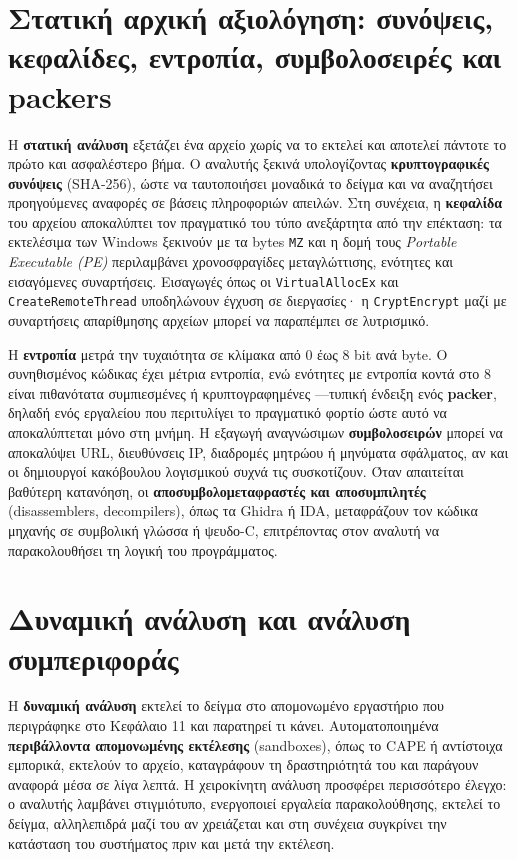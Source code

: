 \documentclass[11pt,openany]{book}
\begin{document}
\section{Στατική αρχική αξιολόγηση: συνόψεις, κεφαλίδες, εντροπία, συμβολοσειρές και packers}\label{sec:12.1}
Η \textbf{στατική ανάλυση} εξετάζει ένα αρχείο χωρίς να το εκτελεί και αποτελεί πάντοτε το πρώτο και ασφαλέστερο βήμα. Ο αναλυτής ξεκινά υπολογίζοντας \textbf{κρυπτογραφικές συνόψεις} (SHA-256), ώστε να ταυτοποιήσει μοναδικά το δείγμα και να αναζητήσει προηγούμενες αναφορές σε βάσεις πληροφοριών απειλών. Στη συνέχεια, η \textbf{κεφαλίδα} του αρχείου αποκαλύπτει τον πραγματικό του τύπο ανεξάρτητα από την επέκταση: τα εκτελέσιμα των Windows ξεκινούν με τα bytes \texttt{MZ} και η δομή τους \emph{Portable Executable (PE)} περιλαμβάνει χρονοσφραγίδες μεταγλώττισης, ενότητες και εισαγόμενες συναρτήσεις. Εισαγωγές όπως οι \texttt{VirtualAllocEx} και \texttt{CreateRemoteThread} υποδηλώνουν έγχυση σε διεργασίες· η \texttt{CryptEncrypt} μαζί με συναρτήσεις απαρίθμησης αρχείων μπορεί να παραπέμπει σε λυτρισμικό.

Η \textbf{εντροπία} μετρά την τυχαιότητα σε κλίμακα από 0 έως 8 bit ανά byte. Ο συνηθισμένος κώδικας έχει μέτρια εντροπία, ενώ ενότητες με εντροπία κοντά στο 8 είναι πιθανότατα συμπιεσμένες ή κρυπτογραφημένες —τυπική ένδειξη ενός \textbf{packer}, δηλαδή ενός εργαλείου που περιτυλίγει το πραγματικό φορτίο ώστε αυτό να αποκαλύπτεται μόνο στη μνήμη. Η εξαγωγή αναγνώσιμων \textbf{συμβολοσειρών} μπορεί να αποκαλύψει URL, διευθύνσεις IP, διαδρομές μητρώου ή μηνύματα σφάλματος, αν και οι δημιουργοί κακόβουλου λογισμικού συχνά τις συσκοτίζουν. Όταν απαιτείται βαθύτερη κατανόηση, οι \textbf{αποσυμβολομεταφραστές και αποσυμπιλητές} (disassemblers, decompilers), όπως τα Ghidra ή IDA, μεταφράζουν τον κώδικα μηχανής σε συμβολική γλώσσα ή ψευδο-C, επιτρέποντας στον αναλυτή να παρακολουθήσει τη λογική του προγράμματος.

\section{Δυναμική ανάλυση και ανάλυση συμπεριφοράς}\label{sec:12.2}
Η \textbf{δυναμική ανάλυση} εκτελεί το δείγμα στο απομονωμένο εργαστήριο που περιγράφηκε στο Κεφάλαιο 11 και παρατηρεί τι κάνει. Αυτοματοποιημένα \textbf{περιβάλλοντα απομονωμένης εκτέλεσης} (sandboxes), όπως το CAPE ή αντίστοιχα εμπορικά, εκτελούν το αρχείο, καταγράφουν τη δραστηριότητά του και παράγουν αναφορά μέσα σε λίγα λεπτά. Η χειροκίνητη ανάλυση προσφέρει περισσότερο έλεγχο: ο αναλυτής λαμβάνει στιγμιότυπο, ενεργοποιεί εργαλεία παρακολούθησης, εκτελεί το δείγμα, αλληλεπιδρά μαζί του αν χρειάζεται και στη συνέχεια συγκρίνει την κατάσταση του συστήματος πριν και μετά την εκτέλεση.
\end{document}
